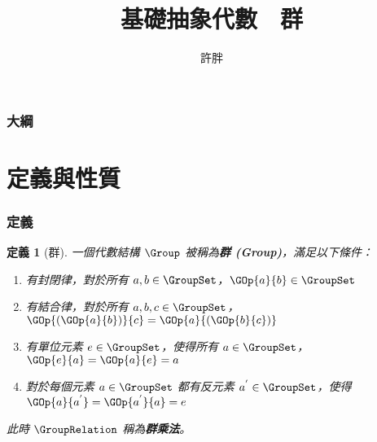 \documentclass[utf8]{beamer}
\begin{document}
\begin{CJK}{UTF8}{bkai}

\newtheorem{mydef}{定義}[section]
\newtheorem*{mydef*}{定義}
\newtheorem{myrule}[mydef]{原理}
\newtheorem{mythm}[mydef]{定理}
\newtheorem{mylma}[mydef]{引理}
\renewenvironment{proof}{\textbf{證明}}{\qed}
\newenvironment{mysol}{\textbf{解答}}{\qed}
\newenvironment{mypropo}{\begin{exampleblock}{性質}}{\end{exampleblock}}
\newenvironment{mycorol}{\begin{exampleblock}{推論}}{\end{exampleblock}}
\newenvironment{myexample}{\begin{exampleblock}{範例}}{\end{exampleblock}}
\newenvironment{mynote*}{\begin{alertblock}{註}}{\end{alertblock}}



\title{基礎抽象代數　群}
\author{許胖}

\begin{frame}
  \titlepage
\end{frame}
\begin{frame}
  \frametitle{大綱}
  \tableofcontents
\end{frame}

\section{定義與性質}

\begin{frame}
  \frametitle{定義}
  \begin{mydef}[群]
  \label{def:group:group}
  一個代數結構 $\Group$ 被稱為\textbf{群 (Group)}，滿足以下條件：
  \begin{enumerate}
  \item<2-> \label{def:group:g1} 有封閉律，對於所有 $a,b\in{\GroupSet}$，$\GOp{a}{b}\in{\GroupSet}$
  \item<3-> \label{def:group:g2} 有結合律，對於所有 $a,b,c\in{\GroupSet}$，$\GOp{(\GOp{a}{b})}{c}=\GOp{a}{(\GOp{b}{c})}$
  \item<4-> \label{def:group:g3} 有單位元素 $e\in{\GroupSet}$，使得所有 $a\in{\GroupSet}$，$\GOp{e}{a}=\GOp{a}{e}=a$
  \item<5-> \label{def:group:g4} 對於每個元素 $a\in{\GroupSet}$ 都有反元素 $a^{'}\in{\GroupSet}$，使得 $\GOp{a}{a^{'}}=\GOp{a^{'}}{a}=e$
  \end{enumerate}
  此時 $\GroupRelation$ 稱為\textbf{群乘法}。
  \end{mydef}
\end{frame}


\end{CJK}
\end{document}
